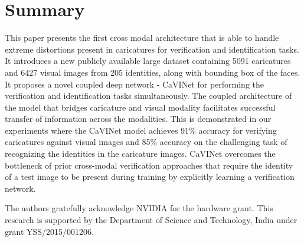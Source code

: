 \section{Summary}
This paper presents the first cross modal architecture that is able to handle extreme distortions present in caricatures for verification and identification tasks. It introduces a new publicly available large dataset containing 5091 caricatures and 6427 visual images from 205 identities, along with bounding box of the faces. It proposes a novel coupled deep network - CaVINet for performing the verification and identification tasks simultaneously. %
The coupled architecture of the model that bridges caricature and visual modality facilitates successful transfer of information across the modalities. This is demonstrated in our experiments where the CaVINet model achieves 91\% accuracy for verifying caricatures against visual images and 85\% accuracy on the challenging task of recognizing the identities in the caricature images. CaVINet overcomes the bottleneck of prior cross-modal verification approaches that require the identity of a test image to be present during training by explicitly learning a verification network. 




\begin{acks}
 The authors gratefully acknowledge NVIDIA for the hardware grant. This research is supported by the Department of Science and Technology, India under grant YSS/2015/001206.
\end{acks}
